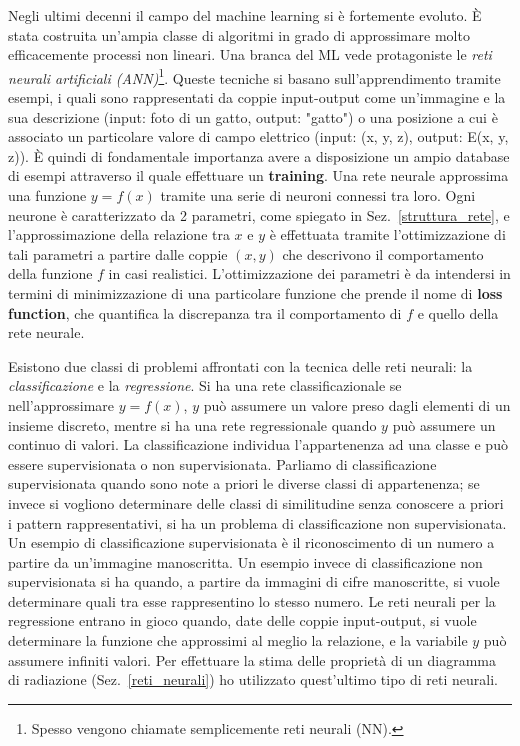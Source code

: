 \documentclass[12pt,a4paper,final]{book}
\begin{document}
Negli ultimi decenni il campo del machine learning si è fortemente evoluto. È stata costruita un'ampia classe di algoritmi in grado di approssimare molto efficacemente processi non lineari. Una branca del ML vede protagoniste le \textit{reti neurali artificiali (ANN)}\footnote{Spesso vengono chiamate semplicemente reti neurali (NN).}.
Queste tecniche si basano sull'apprendimento tramite esempi, i quali sono rappresentati da coppie input-output come un'immagine e la sua descrizione (input: foto di un gatto, output: "gatto") o una posizione a cui è associato un particolare valore di campo elettrico (input: (x, y, z), output: E(x, y, z)). È quindi di fondamentale importanza avere a disposizione un ampio database di esempi attraverso il quale effettuare un \textbf{training}.
Una rete neurale approssima una funzione $y=f(x)$ tramite una serie di neuroni connessi tra loro. Ogni neurone è caratterizzato da 2 parametri, come spiegato in Sez.~\ref{struttura_rete}, e l'approssimazione della relazione tra $x$ e $y$ è effettuata tramite l'ottimizzazione di tali parametri a partire dalle coppie $(x, y)$ che descrivono il comportamento della funzione $f$ in casi realistici. L'ottimizzazione dei parametri è da intendersi in termini di minimizzazione di una particolare funzione che prende il nome di \textbf{loss function}, che quantifica la discrepanza tra il comportamento di $f$ e quello della rete neurale. 


Esistono due classi di problemi affrontati con la tecnica delle reti neurali: la \textit{classificazione} e la \textit{regressione}.
Si ha una rete classificazionale se nell'approssimare $y=f(x)$, $y$ può assumere un valore preso dagli elementi di un insieme discreto, mentre si ha una rete regressionale quando $y$ può assumere un continuo di valori.
La classificazione individua l'appartenenza ad una classe e può essere supervisionata o non supervisionata. Parliamo di classificazione supervisionata quando sono note a priori le diverse classi di appartenenza; se invece si vogliono determinare delle classi di similitudine senza conoscere a priori i pattern rappresentativi, si ha un problema di classificazione non supervisionata.
Un esempio di classificazione supervisionata è il riconoscimento di un numero a partire da un'immagine manoscritta. Un esempio invece di classificazione non supervisionata si ha quando, a partire da immagini di cifre manoscritte, si vuole determinare quali tra esse rappresentino lo stesso numero.
Le reti neurali per la regressione entrano in gioco quando, date delle coppie input-output, si vuole determinare la funzione che approssimi al meglio la relazione, e la variabile $y$ può assumere infiniti valori. Per effettuare la stima delle proprietà di un diagramma di radiazione (Sez.~\ref{reti_neurali}) ho utilizzato quest'ultimo tipo di reti neurali.
\end{document}

